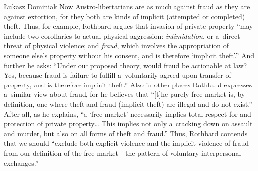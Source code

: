 \begin{artengenv}{Łukasz Dominiak}
Now Austro-libertarians are as much against fraud as they are against extortion, for they both are kinds of implicit (attempted or completed) theft. Thus, for example, Rothbard 
\parencite*[][p.77]{rothbard_ethics_1998} %
 argues that invasion of private property ``may include two corollaries to actual physical aggression: \textit{intimidation}, or a~direct threat of physical violence; and \textit{fraud}, which involves the appropriation of someone else's property without his consent, and is therefore ‘implicit theft'.'' And further he asks: ``Under our proposed theory, would fraud be actionable at law? Yes, because fraud is failure to fulfill a~voluntarily agreed upon transfer of property, and is therefore implicit theft.'' 
\parencite[][p.143]{rothbard_ethics_1998} %
 Also in other places Rothbard expresses a~similar view about fraud, for he 
\parencite*[][p.803]{rothbard_man_2009} %
 believes that ``[t]he purely free market is, by definition, one where theft and fraud (implicit theft) are illegal and do not exist.'' After all, as he 
\parencite[][p.216]{rothbard_toward_2011} %
 explains, ``a ‘free market' necessarily implies total respect for and protection of private property… This implies not only a~cracking down on assault and murder, but also on all forms of theft and fraud.'' Thus, Rothbard 
\parencite*[][p.184]{rothbard_man_2009} %
 contends that we should ``exclude both explicit violence and the implicit violence of fraud from our definition of the free market---the pattern of voluntary interpersonal exchanges.''




\end{artengenv}
